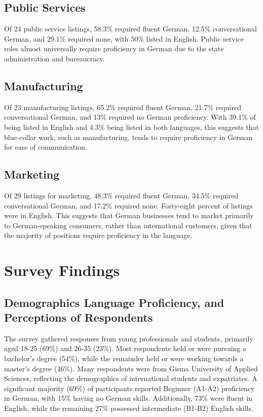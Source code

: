 \subsection{Public Services}
Of 24 public service listings, 58.3\% required fluent German, 12.5\% conversational German, and 29.1\% required none, with 50\% listed in English. Public service roles almost universally require proficiency in German due to the state administration and bureaucracy.   

\subsection{Manufacturing}
Of 23 manufacturing listings, 65.2\% required fluent German, 21.7\% required conversational German, and 13\% required no German proficiency. With 39.1\% of being listed in English and 4.3\% being listed in both languages, this suggests that blue-collar work, such as manufacturing, tends to require proficiency in German for ease of communication.

\subsection{Marketing}
Of 29 listings for marketing, 48.3\% required fluent German, 34.5\% required conversational German, and 17.2\% required none. Forty-eight percent of listings were in English. This suggests that German businesses tend to market primarily to German-speaking consumers, rather than international customers, given that the majority of positions require proficiency in the language.

\section{Survey Findings}
\vspace{5pt}
\subsection{Demographics Language Proficiency, and Perceptions of Respondents}
The survey gathered responses from young professionals and students, primarily aged 18-25 (69\%) and 26-35 (23\%). Most respondents held or were pursuing a bachelor’s degree (54\%), while the remainder held or were working towards a master’s degree (46\%). Many respondents were from Gisma University of Applied Sciences, reflecting the demographics of international students and expatriates. A significant majority (69\%) of participants reported Beginner (A1-A2) proficiency in German, with 15\% having no German skills. Additionally, 73\% were fluent in English, while the remaining 27\% possessed intermediate (B1-B2) English skills.

